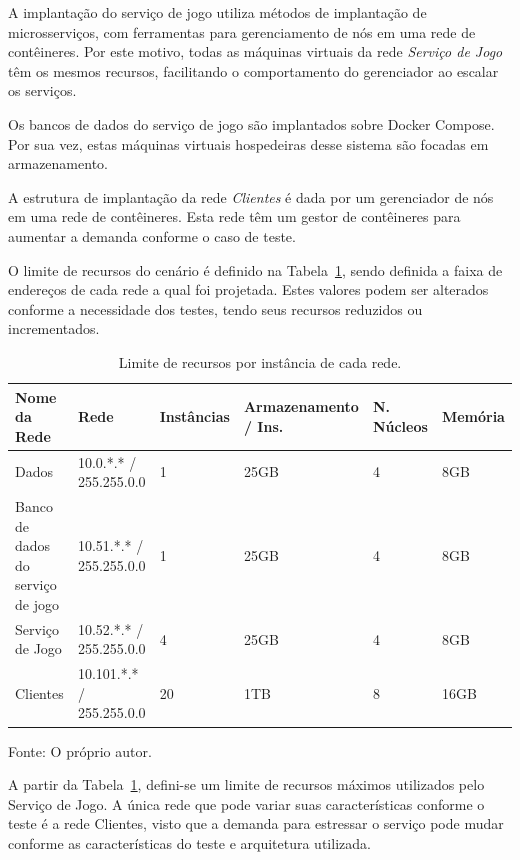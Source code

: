 A implantação do serviço de jogo utiliza métodos de implantação de microsserviços, com ferramentas para gerenciamento de nós em uma rede de contêineres.
%
Por este motivo, todas as máquinas virtuais da rede \textit{Serviço de Jogo} têm os mesmos recursos, facilitando o comportamento do gerenciador ao escalar os serviços.

Os bancos de dados do serviço de jogo são implantados sobre Docker Compose.
%
Por sua vez, estas máquinas virtuais hospedeiras desse sistema são focadas em armazenamento.

A estrutura de implantação da rede \textit{Clientes} é dada por um gerenciador de nós em uma rede de contêineres.
%
Esta rede têm um gestor de contêineres para aumentar a demanda conforme o caso de teste.

O limite de recursos do cenário é definido na Tabela~\ref{tab:limite_recursos}, sendo definida a faixa de endereços de cada rede a qual foi projetada.
%
Estes valores podem ser alterados conforme a necessidade dos testes, tendo seus recursos reduzidos ou incrementados.

\begin{table}[htb!]
\centering
\begin{adjustbox}{max width=\textwidth}
\caption{Limite de recursos por instância de cada rede.}
\label{tab:limite_recursos}
\begin{tabular}{l|l|l|l|l|l}
\hline \hline
Nome da Rede                      & Rede                     & Instâncias & Armazenamento / Ins. & N. Núcleos & Memória \\ \hline \hline
Dados                             & 10.0.*.* / 255.255.0.0   & 1          & 25GB                & 4          & 8GB     \\ \hline
Banco de dados do serviço de jogo & 10.51.*.* / 255.255.0.0  & 1          & 25GB                & 4          & 8GB     \\ \hline
Serviço de Jogo                   & 10.52.*.* / 255.255.0.0  & 4         & 25GB                 & 4          & 8GB     \\ \hline
Clientes                          & 10.101.*.* / 255.255.0.0 & 20          & 1TB                 & 8          & 16GB     \\ \hline \hline
\end{tabular}
\end{adjustbox}

Fonte: O próprio autor.
\end{table}

A partir da Tabela~\ref{tab:limite_recursos}, defini-se um limite de recursos máximos utilizados pelo Serviço de Jogo.
%
A única rede que pode variar suas características conforme o teste é a rede Clientes, visto que a demanda para estressar o serviço pode mudar conforme as características do teste e arquitetura utilizada.

